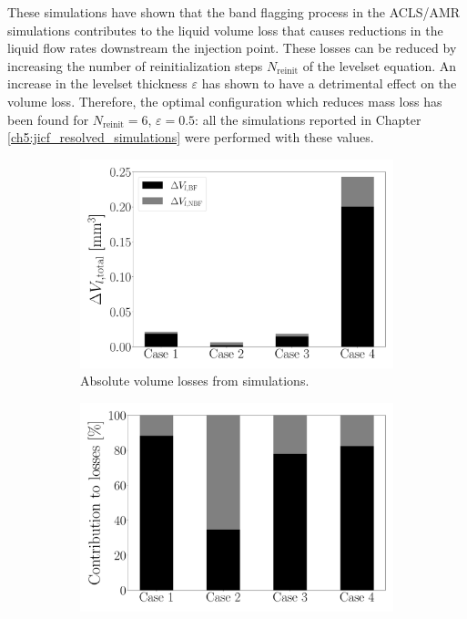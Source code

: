 These simulations have shown that the band flagging process in the ACLS/AMR simulations contributes to the liquid volume loss that causes reductions in the liquid flow rates downstream the injection point. These losses can be reduced by increasing the number of reinitialization steps $N_\mathrm{reinit}$ of the levelset equation. An increase in the levelset thickness $\varepsilon$ has shown to have a detrimental effect on the volume loss. Therefore, the optimal configuration which reduces mass loss has been found for $N_\mathrm{reinit} = 6$, $\varepsilon = 0.5$: all the simulations reported in Chapter \ref{ch5:jicf_resolved_simulations} were performed with these values.




\begin{figure}[ht]
\centering
\begin{subfigure}[b]{0.45\textwidth}
	\centering
   \includegraphics[scale=0.2]{./part2_developments/figures_ch5_resolved_JICF/flow_rates_mass_loss_set_levelset_band/bar_graph_dv_l}
   \vspace*{-0.2in}
   \caption{Absolute volume losses from simulations.}
\end{subfigure}
\hfill
\begin{subfigure}[b]{0.45\textwidth}
	\centering
   \includegraphics[scale=0.2]{./part2_developments/figures_ch5_resolved_JICF/flow_rates_mass_loss_set_levelset_band/bar_graph_losses_percentage}

\end{subfigure}
\end{figure}
